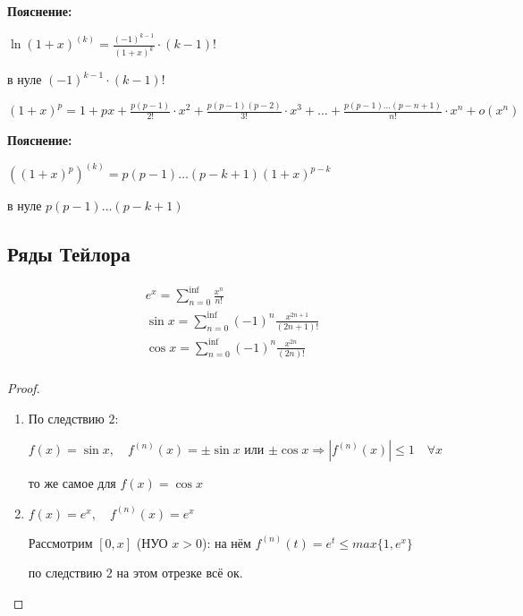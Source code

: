\begin{center}
    \begin{flushleft}
    \textbf{Пояснение:}

    $\ln(1 + x)^{(k)} = \frac{(-1)^{k-1}}{(1 + x)^k} \cdot (k - 1)!$
    
    в нуле $(-1)^{k-1} \cdot (k - 1)!$
    \end{flushleft}
    $\quad$ \\
    $(1 + x)^p = 1 + px + \frac{p(p-1)}{2!} \cdot x^2 + \frac{p(p-1)(p-2)}{3!} \cdot x^3 + \dots + \frac{p(p-1) \dots (p - n + 1)}{n!} \cdot x^n + o(x^n)$ 

    \begin{flushleft}
    \textbf{Пояснение:}

    $((1 + x)^p)^{(k)} = p(p-1) \dots (p - k + 1)(1 + x)^{p-k}$

    в нуле $p(p-1) \dots (p - k + 1)$
    \end{flushleft}
\end{center}

\subsection*{Ряды Тейлора}

\begin{gather*}
    e^x = \sum_{n = 0}^{\inf} \frac{x^n}{n!}  \\
    \sin x = \sum_{n = 0}^{\inf} (-1)^n \frac{x^{2n+1}}{(2n+1)!} \\
    \cos x = \sum_{n = 0}^{\inf} (-1)^n \frac{x^{2n}}{(2n)!} \\
\end{gather*}

\begin{proof}
    $\quad$ \\
    \begin{enumerate}
    \item 
    По следствию $2$:

    $f(x) = \sin x, \quad f^{(n)}(x) = \pm \sin x$ или $\pm \cos x \Longrightarrow | f^{(n)}(x)| \leqslant 1 \quad \forall x$

    то же самое для $f(x) = \cos x$

    \item 
    $f(x) = e^x, \quad f^{(n)}(x) = e^x$

    Рассмотрим $[0, x]$ (НУО $x > 0$): на нём $f^{(n)}(t) = e^t \leqslant max \{ 1, e^x \}$

    по следствию $2$ на этом отрезке всё ок.

    \end{enumerate}
\end{proof}

